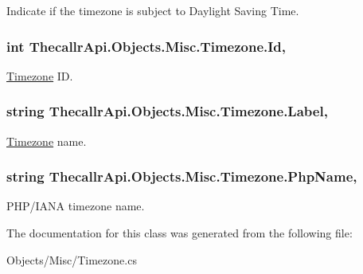 Indicate if the timezone is subject to Daylight Saving Time. 

\hypertarget{class_thecallr_api_1_1_objects_1_1_misc_1_1_timezone_ab9adc22c5aa360444e0fb49ec606f3d8}{
\subsubsection[{Id}]{\setlength{\rightskip}{0pt plus 5cm}int Thecallr\+Api.\+Objects.\+Misc.\+Timezone.\+Id\hspace{0.3cm}{\ttfamily [get]}, {\ttfamily [set]}}}\label{class_thecallr_api_1_1_objects_1_1_misc_1_1_timezone_ab9adc22c5aa360444e0fb49ec606f3d8}


\hyperlink{class_thecallr_api_1_1_objects_1_1_misc_1_1_timezone}{Timezone} I\+D. 

\hypertarget{class_thecallr_api_1_1_objects_1_1_misc_1_1_timezone_a1583c475af1c82150d387bff9ba98edb}{
\subsubsection[{Label}]{\setlength{\rightskip}{0pt plus 5cm}string Thecallr\+Api.\+Objects.\+Misc.\+Timezone.\+Label\hspace{0.3cm}{\ttfamily [get]}, {\ttfamily [set]}}}\label{class_thecallr_api_1_1_objects_1_1_misc_1_1_timezone_a1583c475af1c82150d387bff9ba98edb}


\hyperlink{class_thecallr_api_1_1_objects_1_1_misc_1_1_timezone}{Timezone} name. 

\hypertarget{class_thecallr_api_1_1_objects_1_1_misc_1_1_timezone_ad8396fddbcc1b25bdf8bf4627c20fe4b}{
\subsubsection[{Php\+Name}]{\setlength{\rightskip}{0pt plus 5cm}string Thecallr\+Api.\+Objects.\+Misc.\+Timezone.\+Php\+Name\hspace{0.3cm}{\ttfamily [get]}, {\ttfamily [set]}}}\label{class_thecallr_api_1_1_objects_1_1_misc_1_1_timezone_ad8396fddbcc1b25bdf8bf4627c20fe4b}


P\+H\+P/\+I\+A\+N\+A timezone name. 



The documentation for this class was generated from the following file\+:\begin{DoxyCompactItemize}
\item 
Objects/\+Misc/Timezone.\+cs\end{DoxyCompactItemize}
